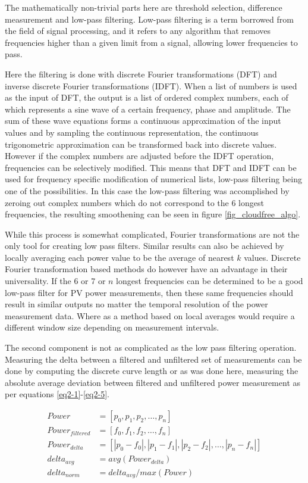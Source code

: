 \noindent The mathematically non-trivial parts here are threshold selection, difference measurement and low-pass filtering. Low-pass filtering is a term borrowed from the field of signal processing, and it refers to any algorithm that removes frequencies higher than a given limit from a signal, allowing lower frequencies to pass. 



Here the filtering is done with discrete Fourier transformations (DFT) and inverse discrete Fourier transformations (IDFT). When a list of numbers is used as the input of DFT, the output is a list of ordered complex numbers, each of which represents a sine wave of a certain frequency, phase and amplitude. The sum of these wave equations forms a continuous approximation of the input values and by sampling the continuous representation, the continuous trigonometric approximation can be transformed back into discrete values. However if the complex numbers are adjusted before the IDFT operation, frequencies can be selectively modified. This means that DFT and IDFT can be used for frequency specific modification of numerical lists, low-pass filtering being one of the possibilities. In this case the low-pass filtering was accomplished by zeroing out complex numbers which do not correspond to the 6 longest frequencies, the resulting smoothening can be seen in figure \ref{fig_cloudfree_algo}.


While this process is somewhat complicated, Fourier transformations are not the only tool for creating low pass filters. Similar results can also be achieved by locally averaging each power value to be the average of nearest $k$ values. Discrete Fourier transformation based methods do however have an advantage in their universality. If the 6 or 7 or $n$ longest frequencies can be determined to be a good low-pass filter for PV power measurements, then these same frequencies should result in similar outputs no matter the temporal resolution of the power measurement data. Where as a method based on local averages would require a different window size depending on measurement intervals.

The second component is not as complicated as the low pass filtering operation. Measuring the delta between a filtered and unfiltered set of measurements can be done by computing the discrete curve length or as was done here, measuring the absolute average deviation between filtered and unfiltered power measurement as per equations \ref{eq2-1}-\ref{eq2-5}.


\begin{align}
Power &= [p_0, p_1, p_2, \dots , p_n]   \label{eq2-1}\\ 
Power_{filtered} &= [f_0, f_1, f_2, \dots , f_n] \\
Power_{delta} &= [|p_0 - f_0|, |p_1-f_1|, |p_2-f_2|, \dots , |p_n-f_n|] \\
delta_{avg} &= avg(Power_{delta}) \\
delta_{norm} &= delta_{avg}/ max(Power) \label{eq2-5}
\end{align}


